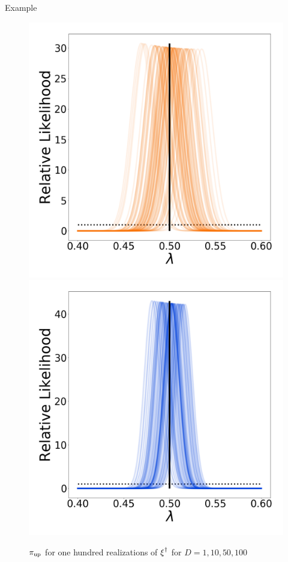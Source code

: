 \begin{block}{Example}
\begin{figure}
        \includegraphics[width=12cm]{updated_stability_D50_sigma-10E-4}
        \includegraphics[width=12cm]{updated_stability_D100_sigma-10E-4}
        \caption*{$\operatorname*{\pi_{up}}$ for one hundred realizations of $\operatorname*{\xi}^\dagger$ for $D=1, 10, 50, 100$}
    \end{figure}

\end{block}
